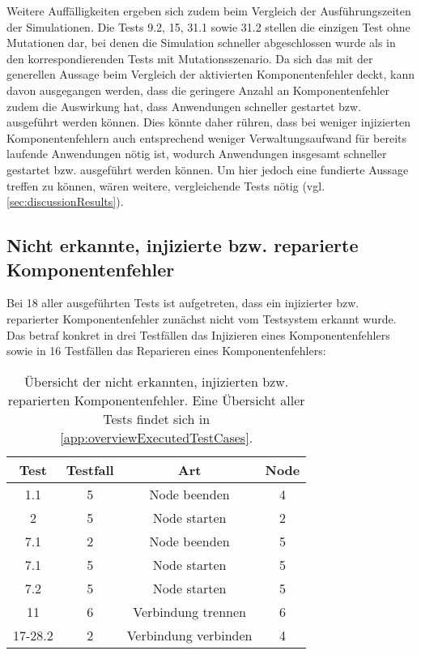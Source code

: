 Weitere Auffälligkeiten ergeben sich zudem beim Vergleich der Ausführungszeiten der Simulationen.
Die Tests 9.2, 15, 31.1 sowie 31.2 stellen die einzigen Test ohne Mutationen dar, bei denen die Simulation schneller abgeschlossen wurde als in den korrespondierenden Tests mit Mutationsszenario.
Da sich das mit der generellen Aussage beim Vergleich der aktivierten Komponentenfehler deckt, kann davon ausgegangen werden, dass die geringere Anzahl an Komponentenfehler zudem die Auswirkung hat, dass Anwendungen schneller gestartet bzw. ausgeführt werden können.
Dies könnte daher rühren, dass bei weniger injizierten Komponentenfehlern auch entsprechend weniger Verwaltungsaufwand für bereits laufende Anwendungen nötig ist, wodurch Anwendungen insgesamt schneller gestartet bzw. ausgeführt werden können.
Um hier jedoch eine fundierte Aussage treffen zu können, wären weitere, vergleichende Tests nötig (vgl. \cref{sec:discussionResults}).

\subsection{Nicht erkannte, injizierte bzw. reparierte Komponentenfehler}
\label{subsec:notDetectedFaults}

Bei 18 aller ausgeführten Tests ist aufgetreten, dass ein injizierter bzw. reparierter Komponentenfehler zunächst nicht vom Testsystem erkannt wurde.
Das betraf konkret in drei Testfällen das Injizieren eines Komponentenfehlers sowie in 16 Testfällen das Reparieren eines Komponentenfehlers:

\begin{table}[h]
    \begin{tabular}{c|ccc}
    	 Test   & Testfall &         Art          & Node \\ \hline
    	  1.1   &    5     &     Node beenden     &  4   \\
    	   2    &    5     &     Node starten     &  2   \\
    	  7.1   &    2     &     Node beenden     &  5   \\
    	  7.1   &    5     &     Node starten     &  5   \\
    	  7.2   &    5     &     Node starten     &  5   \\
    	  11    &    6     &  Verbindung trennen  &  6   \\
    	17-28.2 &    2     & Verbindung verbinden &  4
    \end{tabular} 
    \caption[Übersicht der nicht erkannten, injizierten/reparierten Komponentenfehler]
    {Übersicht der nicht erkannten, injizierten bzw. reparierten Komponentenfehler.
    Eine Übersicht aller Tests findet sich in \cref{app:overviewExecutedTestCases}.}
    \label{tab:notDetectedFaults}
\end{table}

